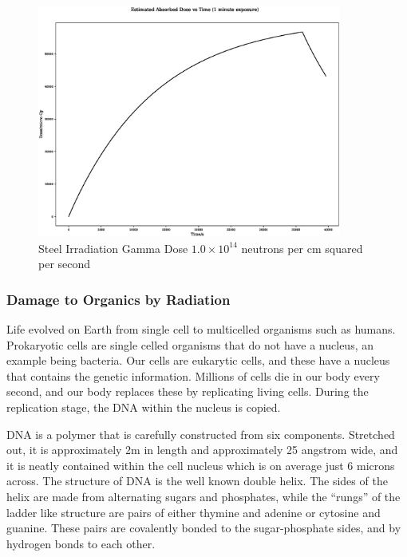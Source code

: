 \begin{figure}
  \begin{center}
    \includegraphics[width=10.0cm]{chapters/consequences_of_ionizing_radiation/neutron_plots/2/gamma_dose.eps}
    \caption{Steel Irradiation Gamma Dose $1.0 \times 10^{14}$ neutrons per cm squared per second}
    \label{fig:neutron_irradiated_steel_dose2}
  \end{center}
\end{figure}


\FloatBarrier

\subsubsection{Damage to Organics by Radiation}

Life evolved on Earth from single cell to multicelled organisms such as humans.  Prokaryotic cells are single celled organisms that do not have a nucleus, an example being bacteria.  Our cells are eukarytic cells, and these have a nucleus that contains the genetic information.  Millions of cells die in our body every second, and our body replaces these by replicating living cells.  During the replication stage, the DNA within the nucleus is copied.    

DNA is a polymer that is carefully constructed from six components.  Stretched out, it is approximately 2m in length and approximately 25 angstrom wide, and it is neatly contained within the cell nucleus which is on average just 6 microns across.  The structure of DNA is the well known double helix.  The sides of the helix are made from alternating sugars and phosphates, while the \enquote{rungs} of the ladder like structure are pairs of either thymine and adenine or cytosine and guanine.  These pairs are covalently bonded to the sugar-phosphate sides, and by hydrogen bonds to each other.

